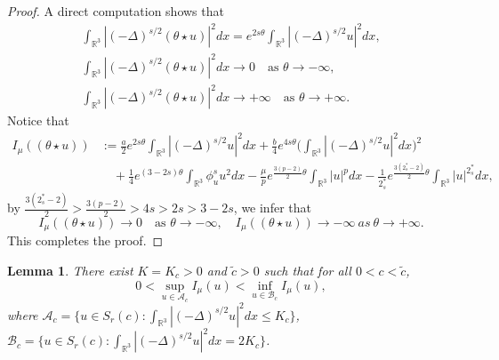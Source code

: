 \documentclass[11pt]{article}
\numberwithin{equation}{section}
\newtheorem{lemma}[theorem]{Lemma}
\begin{document}
\begin{proof}
 A direct computation shows that
 \begin{gather*} %
\int_{\mathbb{R}^3}|(-\Delta)^{s/2}(\theta \star u)|^2dx=e^{2s\theta}
\int_{\mathbb{R}^3}|(-\Delta)^{s/2}u|^2dx, \\
\label{unreferenced-fiber-5.4}
\int_{\mathbb{R}^3}|(-\Delta)^{s/2}(\theta \star u)|^2dx\to 0\quad
\text{as }\theta \to -\infty, \\
\label{5.41}
\int_{\mathbb{R}^3}|(-\Delta)^{s/2}(\theta \star u)|^2dx\to +\infty\quad
\text{as }\theta \to +\infty.
\end{gather*}
Notice that
\begin{align*}%
I_\mu((\theta \star u))
&:= \frac{a}{2}e^{2s\theta}\int_{\mathbb{R}^3}|(-\Delta)^{s/2}u|^2dx
+\frac{b}{4}e^{4s\theta}\Big(\int_{\mathbb{R}^3}|(-\Delta)^{s/2}u|^2dx\Big)^2\\
&\quad +\frac{1}{4}e^{(3-2s)\theta}\int_{\mathbb{R}^3}\phi^s_u u^2dx
 -\frac{\mu}{p}e^{\frac{3(p-2)}{2}\theta}\int_{\mathbb{R}^3}|u|^pdx
 -\frac{1}{2^*_s}e^{\frac{3(2^*_s-2)}{2}\theta}\int_{\mathbb{R}^3}|u|^{2^*_s}dx,
\end{align*}
by $\frac{3(2^*_s-2)}{2}>\frac{3(p-2)}{2}>4s>2s>3-2s$, we infer that
$$
 I_\mu((\theta \star u))\to 0 \quad\text{as }\theta \to -\infty,
 \quad I_\mu((\theta \star u))\to -\infty ~as ~\theta \to +\infty.
$$
This completes the proof.
\end{proof}

\begin{lemma}\label{lem5.2} 
There exist $K=K_c>0$ and $\tilde{c}>0$ such that for all $0<c<\tilde{c}$,
\begin{equation}\label{5.3}
0<\sup_{u\in\mathcal{A}_c}I_\mu(u)<\inf_{u\in\mathcal{B}_c}I_\mu(u),
\end{equation}
where $\mathcal{A}_c=\{u\in  S_{r}(c):\int_{\mathbb{R}^3}|
(-\Delta)^{s/2}u|^2dx\leq K_c\}$, 
$\mathcal{B}_c=\{u\in S_{r}(c):\int_{\mathbb{R}^3}|(-\Delta)^{s/2}u|^2dx=2 K_c\}$.
\end{lemma}
\end{document}
